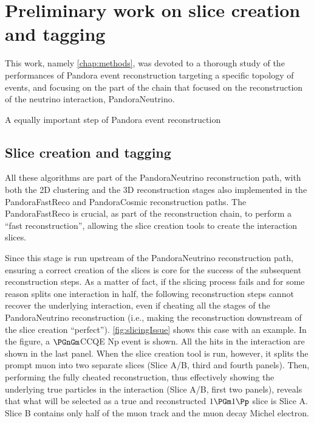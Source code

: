 
\chapter{Preliminary work on slice creation and tagging}
\setcounter{page}{1}
\renewcommand{\thepage}{\Alph{chapter}--\arabic{page}}

This work, namely \autoref{chap:methods}, was devoted to a thorough study of the performances of Pandora event reconstruction targeting a specific topology of events, and focusing on the part of the chain that focused on the reconstruction of the neutrino interaction, PandoraNeutrino. 

A equally important step of Pandora event reconstruction 

\section{Slice creation and tagging}

All these algorithms are part of the PandoraNeutrino reconstruction path, with both the 2D clustering and the 3D reconstruction stages also implemented in the PandoraFastReco and PandoraCosmic reconstruction paths. The PandoraFastReco is crucial, as part of the reconstruction chain, to perform a ``fast reconstruction'', allowing the slice creation tools to create the interaction slices. 

Since this stage is run upstream of the PandoraNeutrino reconstruction path, ensuring a correct creation of the slices is core for the success of the subsequent reconstruction steps. As a matter of fact, if the slicing process fails and for some reason splits one interaction in half, the following reconstruction steps cannot recover the underlying interaction, even if cheating all the stages of the PandoraNeutrino reconstruction (i.e., making the reconstruction downstream of the slice creation ``perfect''). \autoref{fig:slicingIssue} shows this case with an example. In the figure, a $\PGnGm$CCQE Np event is shown. All the hits in the interaction are shown in the last panel. When the slice creation tool is run, however, it splits the prompt muon into two separate slices (Slice A/B, third and fourth panels). Then, performing the fully cheated reconstruction, thus effectively showing the underlying true particles in the interaction (Slice A/B, first two panels), reveals that what will be selected as a true and reconstructed $1\PGm1\Pp$ slice is Slice A. Slice B contains only half of the muon track and the muon decay Michel electron. 

